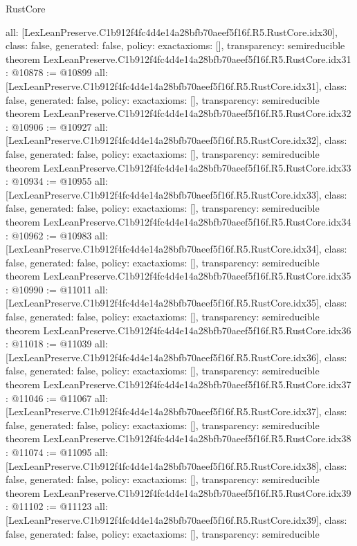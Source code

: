 \begin{lexlean}{RustCore}
\begin{coremodule}
{  all: [LexLeanPreserve.C1b912f4fc4d4e14a28bfb70aeef5f16f.R5.RustCore.idx30],
  class: false,
  generated: false,
  policy: exact{axioms: []},
  transparency: semireducible
}
theorem LexLeanPreserve.C1b912f4fc4d4e14a28bfb70aeef5f16f.R5.RustCore.idx31 : @10878 := @10899 {
  all: [LexLeanPreserve.C1b912f4fc4d4e14a28bfb70aeef5f16f.R5.RustCore.idx31],
  class: false,
  generated: false,
  policy: exact{axioms: []},
  transparency: semireducible
}
theorem LexLeanPreserve.C1b912f4fc4d4e14a28bfb70aeef5f16f.R5.RustCore.idx32 : @10906 := @10927 {
  all: [LexLeanPreserve.C1b912f4fc4d4e14a28bfb70aeef5f16f.R5.RustCore.idx32],
  class: false,
  generated: false,
  policy: exact{axioms: []},
  transparency: semireducible
}
theorem LexLeanPreserve.C1b912f4fc4d4e14a28bfb70aeef5f16f.R5.RustCore.idx33 : @10934 := @10955 {
  all: [LexLeanPreserve.C1b912f4fc4d4e14a28bfb70aeef5f16f.R5.RustCore.idx33],
  class: false,
  generated: false,
  policy: exact{axioms: []},
  transparency: semireducible
}
theorem LexLeanPreserve.C1b912f4fc4d4e14a28bfb70aeef5f16f.R5.RustCore.idx34 : @10962 := @10983 {
  all: [LexLeanPreserve.C1b912f4fc4d4e14a28bfb70aeef5f16f.R5.RustCore.idx34],
  class: false,
  generated: false,
  policy: exact{axioms: []},
  transparency: semireducible
}
theorem LexLeanPreserve.C1b912f4fc4d4e14a28bfb70aeef5f16f.R5.RustCore.idx35 : @10990 := @11011 {
  all: [LexLeanPreserve.C1b912f4fc4d4e14a28bfb70aeef5f16f.R5.RustCore.idx35],
  class: false,
  generated: false,
  policy: exact{axioms: []},
  transparency: semireducible
}
theorem LexLeanPreserve.C1b912f4fc4d4e14a28bfb70aeef5f16f.R5.RustCore.idx36 : @11018 := @11039 {
  all: [LexLeanPreserve.C1b912f4fc4d4e14a28bfb70aeef5f16f.R5.RustCore.idx36],
  class: false,
  generated: false,
  policy: exact{axioms: []},
  transparency: semireducible
}
theorem LexLeanPreserve.C1b912f4fc4d4e14a28bfb70aeef5f16f.R5.RustCore.idx37 : @11046 := @11067 {
  all: [LexLeanPreserve.C1b912f4fc4d4e14a28bfb70aeef5f16f.R5.RustCore.idx37],
  class: false,
  generated: false,
  policy: exact{axioms: []},
  transparency: semireducible
}
theorem LexLeanPreserve.C1b912f4fc4d4e14a28bfb70aeef5f16f.R5.RustCore.idx38 : @11074 := @11095 {
  all: [LexLeanPreserve.C1b912f4fc4d4e14a28bfb70aeef5f16f.R5.RustCore.idx38],
  class: false,
  generated: false,
  policy: exact{axioms: []},
  transparency: semireducible
}
theorem LexLeanPreserve.C1b912f4fc4d4e14a28bfb70aeef5f16f.R5.RustCore.idx39 : @11102 := @11123 {
  all: [LexLeanPreserve.C1b912f4fc4d4e14a28bfb70aeef5f16f.R5.RustCore.idx39],
  class: false,
  generated: false,
  policy: exact{axioms: []},
  transparency: semireducible
}
\end{coremodule}
\end{lexlean}
